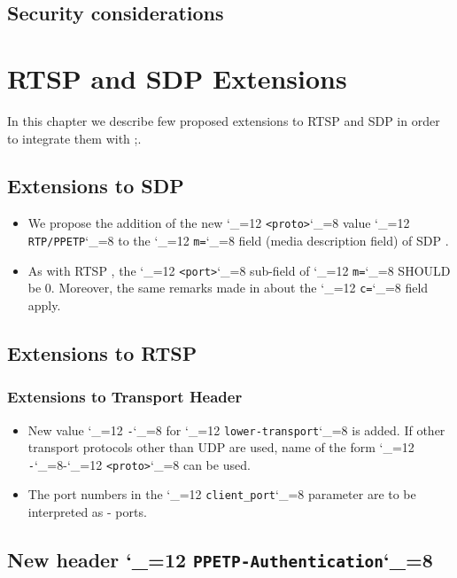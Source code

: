 \documentclass{rfc}
\def\ttt{\catcode`\_=12 \tttii}
\def\tttii#1!{{\tt #1}\catcode`\_=8{}}
\begin{document}
\section{Security considerations}
\label{sect:2.3;transport_layer}



\chapter{RTSP and SDP Extensions}
\label{sect:3;driver}

In this chapter we describe few proposed extensions to RTSP and SDP in
order to integrate them with \ppmtp;.

\section{Extensions to SDP}

\begin{itemize}
\item
We propose the addition of the new \ttt <proto>! value \ttt RTP/PPETP!
to the \ttt m=! field (media description field) of SDP
\cite{rfc4566}.  
\item
As with RTSP \cite{rfc2326}, the \ttt <port>!
sub-field of \ttt m=! SHOULD be 0.  Moreover, the same remarks made in
\cite{rfc2326} about the \ttt c=! field apply.
\end{itemize}


\section{Extensions to RTSP}
\label{subsub:0;transport_layer}

\subsection{Extensions to Transport Header}
\label{sub:0.0;transport_layer}

\begin{itemize}
\item
New value \ttt\ppetp-! for \ttt lower-transport! \cite[Section 12.39,
page 61]{rfc2326} is added.  If other transport protocols other than
UDP are used, name of the form \ttt\ppetp-!-\ttt<proto>! can be used.
\item
The port numbers in the \ttt client_port! parameter are to be
interpreted as \ppetp- ports.
\end{itemize}

\section{New header \protect\ttt PPETP-Authentication!}
\label{sect:3.0;transport_layer}
\end{document}

